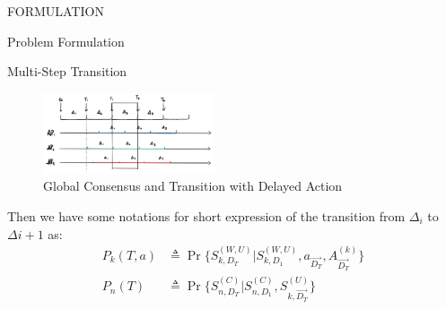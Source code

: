 \documentclass[10pt, conference, letterpaper]{IEEEtran}
\begin{document}
\begin{section}{FORMULATION}
\begin{subsection}{Problem Formulation}
\begin{subsubsection}{Multi-Step Transition}
                \begin{figure}[h]
                    \centering
                    \includegraphics[width=0.45\textwidth]{broadcast-trans.png}
                    \caption{Global Consensus and Transition with Delayed Action}
                    \label{fig:br-trans}
                \end{figure}
                Then we have some notations for short expression of the transition from $\Delta_{i}$ to $\Delta{i+1}$ as:
                \begin{align}
                    P_k(T,a) &\triangleq \Pr\{ S^{(W,U)}_{k,D_T}|S^{(W,U)}_{k,D_1}, a_{\vec{D_T}},A^{(k)}_{\vec{D_T} }\}
                    \\
                    P_n(T) &\triangleq \Pr\{ S^{(C)}_{n,D_T}|S^{(C)}_{n,D_1}, S^{(U)}_{k,\vec{D_T}} \}
                \end{align}


\end{subsubsection}
\end{subsection}
\end{section}
\end{document}
